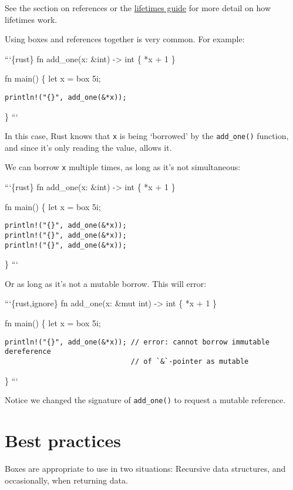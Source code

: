 \documentclass[]{article}
\begin{document}
See the section on references or the
\href{guide-lifetimes.html}{lifetimes guide} for more detail on how
lifetimes work.

Using boxes and references together is very common. For example:

```\{rust\} fn add\_one(x: \&int) -\textgreater{} int \{ *x + 1 \}

fn main() \{ let x = box 5i;

\begin{verbatim}
println!("{}", add_one(&*x));
\end{verbatim}

\} ```

In this case, Rust knows that \texttt{x} is being `borrowed' by the
\texttt{add\_one()} function, and since it's only reading the value,
allows it.

We can borrow \texttt{x} multiple times, as long as it's not
simultaneous:

```\{rust\} fn add\_one(x: \&int) -\textgreater{} int \{ *x + 1 \}

fn main() \{ let x = box 5i;

\begin{verbatim}
println!("{}", add_one(&*x));
println!("{}", add_one(&*x));
println!("{}", add_one(&*x));
\end{verbatim}

\} ```

Or as long as it's not a mutable borrow. This will error:

```\{rust,ignore\} fn add\_one(x: \&mut int) -\textgreater{} int \{ *x +
1 \}

fn main() \{ let x = box 5i;

\begin{verbatim}
println!("{}", add_one(&*x)); // error: cannot borrow immutable dereference 
                              // of `&`-pointer as mutable
\end{verbatim}

\} ```

Notice we changed the signature of \texttt{add\_one()} to request a
mutable reference.

\section{Best practices}\label{best-practices-1}

Boxes are appropriate to use in two situations: Recursive data
structures, and occasionally, when returning data.
\end{document}
